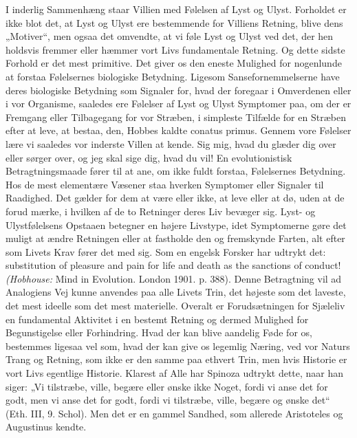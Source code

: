 \documentclass[12pt,a4paper,openany]{book}
\newcommand{\opage}[1]{\marginnote{\footnotesize\textit{[#1]}}}
\begin{document}
I inderlig Sammenhæng staar Villien med Følelsen af Lyst
og Ulyst. Forholdet er ikke blot det, at Lyst og Ulyst ere bestemmende
for Villiens Retning, blive dens „Motiver“, men
ogsaa det omvendte, at vi føle Lyst og Ulyst ved det, der hen%
\setcounter{footnote}{0}%
\opage{42}holdsvis fremmer eller hæmmer vort Livs fundamentale Retning.
Og dette sidste Forhold er det mest primitive. Det giver os
den eneste Mulighed for nogenlunde at forstaa Følelsernes biologiske
Betydning. Ligesom Sansefornemmelserne have deres
biologiske Betydning som Signaler for, hvad der foregaar i Omverdenen
eller i vor Organisme, saaledes ere Følelser af Lyst
og Ulyst Symptomer paa, om der er Fremgang eller Tilbagegang
for vor Stræben, i simpleste Tilfælde for en Stræben efter at
leve, at bestaa, den, Hobbes kaldte conatus primus. Gennem
vore Følelser lære vi saaledes vor inderste Villen at kende.
Sig mig, hvad du glæder dig over eller sørger over, og jeg
skal sige dig, hvad du vil! En evolutionistisk Betragtningsmaade
fører til at ane, om ikke fuldt forstaa, Følelsernes Betydning.
Hos de mest elementære Væsener staa hverken Symptomer
eller Signaler til Raadighed. Det gælder for dem at være
eller ikke, at leve eller at dø, uden at de forud mærke, i
hvilken af de to Retninger deres Liv bevæger sig. Lyst- og
Ulystfølelsens Opstaaen betegner en højere Livstype, idet Symptomerne
gøre det muligt at ændre Retningen eller at fastholde
den og fremskynde Farten, alt efter som Livets Krav fører det
med sig. Som en engelsk Forsker har udtrykt det: substitution
of pleasure and pain for life and death as the sanctions of
conduct! \textit{(Hobhouse:} Mind in Evolution. London 1901. p. 388).
Denne Betragtning vil ad Analogiens Vej kunne anvendes paa
alle Livets Trin, det højeste som det laveste, det mest ideelle
som det mest materielle. Overalt er Forudsætningen for Sjæleliv
en fundamental Aktivitet i en bestemt Retning og dermed
Mulighed for Begunstigelse eller Forhindring. Hvad der kan
blive aandelig Føde for os, bestemmes ligesaa vel som, hvad
der kan give os legemlig Næring, ved vor Naturs Trang og
Retning, som ikke er den samme paa ethvert Trin, men hvis
Historie er vort Livs egentlige Historie. Klarest af Alle har
Spinoza udtrykt dette, naar han siger: „Vi tilstræbe, ville, begære
eller ønske ikke Noget, fordi vi anse det for godt, men
vi anse det for godt, fordi vi tilstræbe, ville, begære og ønske
det“ (Eth. III, 9. Schol). Men det er en gammel Sandhed, som
allerede Aristoteles og Augustinus kendte.
\end{document}
